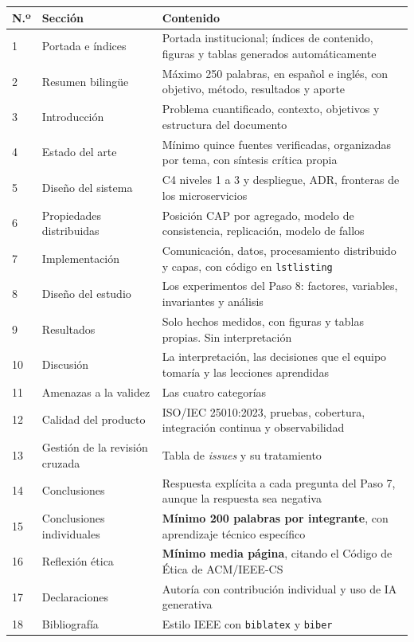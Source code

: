 \documentclass[11pt,a4paper]{article}
\begin{document}
	\begin{center}
		\footnotesize
		\begin{longtable}{@{}p{0.7cm}p{4.4cm}p{10.1cm}@{}}
			\toprule
			\textbf{N.º} & \textbf{Sección} & \textbf{Contenido} \\
			\midrule
			\endhead
			1 & Portada e índices & Portada institucional; índices de contenido, figuras y tablas generados automáticamente \\
			2 & Resumen bilingüe & Máximo 250 palabras, en español e inglés, con objetivo, método, resultados y aporte \\
			3 & Introducción & Problema cuantificado, contexto, objetivos y estructura del documento \\
			4 & Estado del arte & Mínimo quince fuentes verificadas, organizadas por tema, con síntesis crítica propia \\
			5 & Diseño del sistema & C4 niveles 1 a 3 y despliegue, ADR, fronteras de los microservicios \\
			6 & Propiedades distribuidas & Posición CAP por agregado, modelo de consistencia, replicación, modelo de fallos \\
			7 & Implementación & Comunicación, datos, procesamiento distribuido y capas, con código en \texttt{lstlisting} \\
			8 & Diseño del estudio & Los experimentos del Paso 8: factores, variables, invariantes y análisis \\
			9 & Resultados & Solo hechos medidos, con figuras y tablas propias. Sin interpretación \\
			10 & Discusión & La interpretación, las decisiones que el equipo tomaría y las lecciones aprendidas \\
			11 & Amenazas a la validez & Las cuatro categorías \\
			12 & Calidad del producto & ISO/IEC 25010:2023, pruebas, cobertura, integración continua y observabilidad \\
			13 & Gestión de la revisión cruzada & Tabla de \emph{issues} y su tratamiento \\
			14 & Conclusiones & Respuesta explícita a cada pregunta del Paso 7, aunque la respuesta sea negativa \\
			15 & Conclusiones individuales & \textbf{Mínimo 200 palabras por integrante}, con aprendizaje técnico específico \\
			16 & Reflexión ética & \textbf{Mínimo media página}, citando el Código de Ética de ACM/IEEE-CS \\
			17 & Declaraciones & Autoría con contribución individual y uso de IA generativa \\
			18 & Bibliografía & Estilo IEEE con \texttt{biblatex} y \texttt{biber} \\
			\bottomrule
		\end{longtable}
	\end{center}
	
\end{document}

